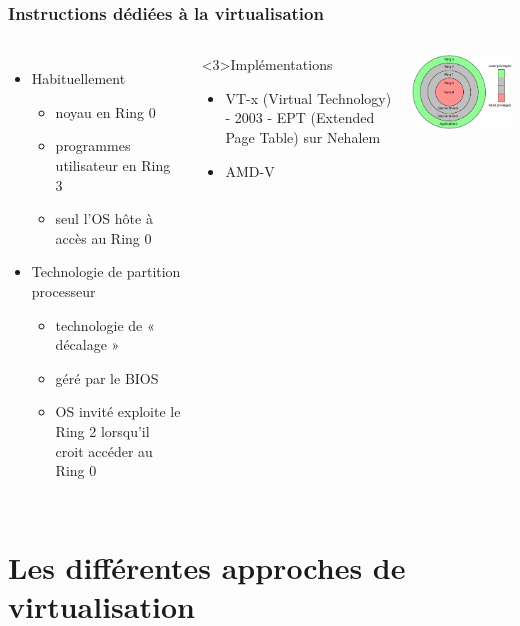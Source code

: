 \begin{frame}
\frametitle{Instructions dédiées à la virtualisation}
\begin{columns}
\begin{itemize}
  \item Habituellement
  \begin{itemize}
  \item noyau en Ring 0
  \item programmes utilisateur en Ring 3
  \item seul l'OS hôte à accès au Ring 0
\end{itemize}
  \item <2->Technologie de partition processeur
\begin{itemize}
  \item technologie de « décalage »
  \item géré par le BIOS
  \item OS invité exploite le Ring 2 lorsqu'il croit accéder au Ring 0
\end{itemize}
\end{itemize}

\begin{exampleblock}<3>{Implémentations}
\begin{itemize}
  \item VT-x (Virtual Technology) - 2003 - EPT (Extended Page Table) sur Nehalem
  \item AMD-V
\end{itemize}
\end{exampleblock}

\includegraphics[width=7cm]{../illustration/cpu-ring-model.png}
\end{columns}
\end{frame}



\section{Les différentes approches de virtualisation}

